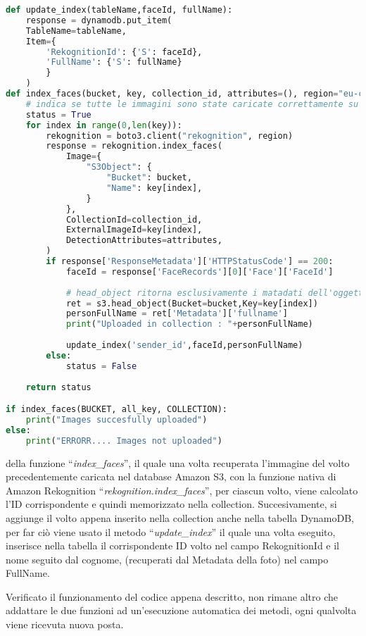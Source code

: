 \begin{lstlisting}[language=Python,frame=single,caption=Codice inserimento volti in DynamoDB e collection,captionpos=t,label=index_code]
def update_index(tableName,faceId, fullName):
    response = dynamodb.put_item(
    TableName=tableName,
    Item={
        'RekognitionId': {'S': faceId},
        'FullName': {'S': fullName}
        }
    )
def index_faces(bucket, key, collection_id, attributes=(), region="eu-central-1"):
    # indica se tutte le immagini sono state caricate correttamente su dynamodb
    status = True 
    for index in range(0,len(key)):
		rekognition = boto3.client("rekognition", region)
		response = rekognition.index_faces(
			Image={
				"S3Object": {
					"Bucket": bucket,
					"Name": key[index],
				}
			},
			CollectionId=collection_id,
			ExternalImageId=key[index],
			DetectionAttributes=attributes,
		)
		if response['ResponseMetadata']['HTTPStatusCode'] == 200:
			faceId = response['FaceRecords'][0]['Face']['FaceId']
		
			# head_object ritorna esclusivamente i matadati dell'oggetto indicato all'interno del bucket specificato
			ret = s3.head_object(Bucket=bucket,Key=key[index])
			personFullName = ret['Metadata']['fullname']
			print("Uploaded in collection : "+personFullName)
   
			update_index('sender_id',faceId,personFullName)
		else:
			status = False
		
    return status

if index_faces(BUCKET, all_key, COLLECTION):
	print("Images succesfully uploaded")
else: 
    print("ERRORR.... Images not uploaded")

\end{lstlisting}
della funzione ``\textsl{index\_faces}'', il quale una volta recuperata l'immagine del volto precedentemente caricata nel database Amazon S3, con la funzione nativa di 
Amazon Rekognition ``\textsl{rekognition.index\_faces}'', per ciascun volto, viene calcolato l'ID corrispondente e quindi memorizzato nella collection.
Succesivamente, si aggiunge il volto appena inserito nella collection anche nella tabella DynamoDB, per far ciò viene usato il metodo 
``\textsl{update\_index}'' il quale una volta eseguito, inserisce nella tabella il corrispondente ID volto nel campo RekognitionId e il nome seguito dal cognome,
(recuperati dal Metadata della foto) nel campo FullName. 

Verificato il funzionamento del codice appena descritto, non rimane altro che addattare le due funzioni ad un'esecuzione automatica dei metodi, ogni qualvolta viene
ricevuta nuova posta.